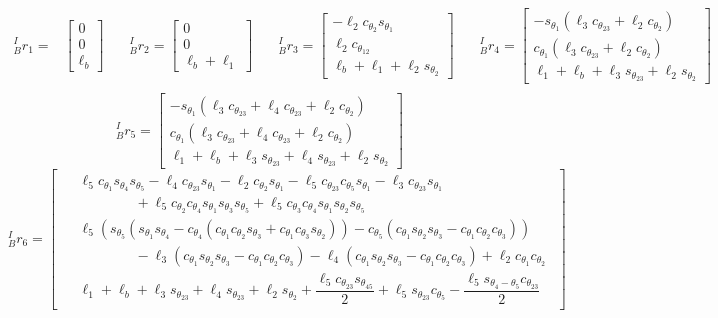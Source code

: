 \[
\begin{aligned}
  ^I_Br_1 =&
  \begin{bmatrix}
    0\\ 0\\ \ell_b
  \end{bmatrix} & \quad
  ^I_Br_2 =
  \begin{bmatrix}
    0\\ 0\\ \ell_b + \ell_1
  \end{bmatrix} & \quad
  ^I_Br_3 =
  \begin{bmatrix}
    -\ell_2c_{\theta_2}s_{\theta_1}\\
    \ell_2c_{\theta_{12}}\\
    \ell_b+\ell_1+\ell_2s_{\theta_2}
  \end{bmatrix} & \quad
  ^I_Br_4 =
  \begin{bmatrix}
    -s_{\theta_1}(\ell_3c_{\theta_{23}} + \ell_2c_{\theta_2}) \\
    c_{\theta_1}(\ell_3c_{\theta_{23}} + \ell_2c_{\theta_2}) \\
    \ell_1 + \ell_b + \ell_3s_{\theta_{23}} + \ell_2s_{\theta_2}
  \end{bmatrix} \\
\end{aligned}
  \]
  \[
  ^I_Br_5 =
  \begin{bmatrix}
    -s_{\theta_1}(\ell_3c_{\theta_{23}} + \ell_4c_{\theta_{23}} + \ell_2c_{\theta_2}) \\
    c_{\theta_1}(\ell_3c_{\theta_{23}} + \ell_4c_{\theta_{23}} + \ell_2c_{\theta_2}) \\
    \ell_1 + \ell_b + \ell_3s_{\theta_{23}} + \ell_4s_{\theta_{23}} + \ell_2s_{\theta_2}
  \end{bmatrix}
  \]
  \[
  ^I_Br_6 =
  \begin{bmatrix}
  \begin{aligned}
      &\ell_5c_{\theta_1}s_{\theta_4}s_{\theta_5} - \ell_4c_{\theta_{23}}s_{\theta_1} - \ell_2c_{\theta_2}s_{\theta_1} - \ell_5c_{\theta_{23}}c_{\theta_5}s_{\theta_1} - \ell_3c_{\theta_{23}}s_{\theta_1} \\
      &\qquad\qquad+ \ell_5c_{\theta_2}c_{\theta_4}s_{\theta_1}s_{\theta_3}s_{\theta_5} + \ell_5c_{\theta_3}c_{\theta_4}s_{\theta_1}s_{\theta_2}s_{\theta_5} \\
      &\ell_5(s_{\theta_5}(s_{\theta_1}s_{\theta_4} - c_{\theta_4}(c_{\theta_1}c_{\theta_2}s_{\theta_3} + c_{\theta_1}c_{\theta_3}s_{\theta_2})) - c_{\theta_5}(c_{\theta_1}s_{\theta_2}s_{\theta_3} - c_{\theta_1}c_{\theta_2}c_{\theta_3})) \\
      &\qquad\qquad -\ell_3(c_{\theta_1}s_{\theta_2}s_{\theta_3} - c_{\theta_1}c_{\theta_2}c_{\theta_3}) -\ell_4(c_{\theta_1}s_{\theta_2}s_{\theta_3} - c_{\theta_1}c_{\theta_2}c_{\theta_3}) + \ell_2c_{\theta_1}c_{\theta_2} \\
      &\ell_1 + \ell_b + \ell_3s_{\theta_{23}} + \ell_4s_{\theta_{23}} + \ell_2s_{\theta_2} + \dfrac{\ell_5c_{\theta_{23}}s_{\theta_{45}}}{2} + \ell_5s_{\theta_{23}}c_{\theta_5} - \dfrac{\ell_5s_{\theta_4 - \theta_5}c_{\theta_{23}}}{2}
    \end{aligned}
  \end{bmatrix}
\]

